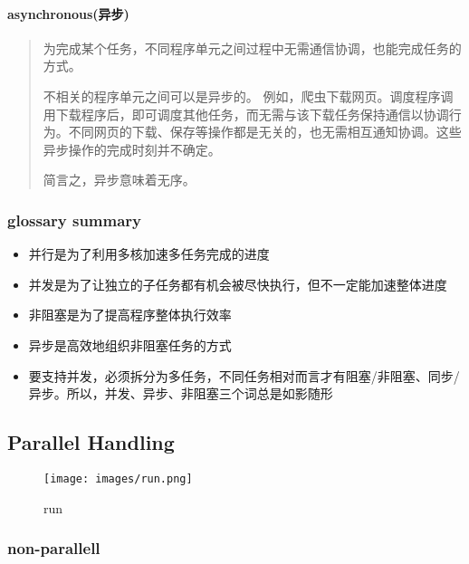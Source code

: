 \documentclass[11pt]{article}
\makeatletter
\def\maxwidth{\ifdim\Gin@nat@width>\linewidth\linewidth
    \else\Gin@nat@width\fi}
\let\Oldincludegraphics\includegraphics
\renewcommand{\includegraphics}[1]{\Oldincludegraphics[width=.8\maxwidth]{#1}}
\providecommand{\tightlist}{%
      \setlength{\itemsep}{0pt}\setlength{\parskip}{0pt}}
\makeatother
\begin{document}
\hypertarget{asynchronousux5f02ux6b65}{%
\paragraph{asynchronous(异步)}\label{asynchronousux5f02ux6b65}}

\begin{quote}
为完成某个任务，不同程序单元之间过程中无需通信协调，也能完成任务的方式。

不相关的程序单元之间可以是异步的。
例如，爬虫下载网页。调度程序调用下载程序后，即可调度其他任务，而无需与该下载任务保持通信以协调行为。不同网页的下载、保存等操作都是无关的，也无需相互通知协调。这些异步操作的完成时刻并不确定。

简言之，异步意味着无序。
\end{quote}

    \hypertarget{glossary-summary}{%
\subsubsection{glossary summary}\label{glossary-summary}}

\begin{itemize}
\tightlist
\item
  并行是为了利用多核加速多任务完成的进度
\item
  并发是为了让独立的子任务都有机会被尽快执行，但不一定能加速整体进度
\item
  非阻塞是为了提高程序整体执行效率
\item
  异步是高效地组织非阻塞任务的方式
\item
  要支持并发，必须拆分为多任务，不同任务相对而言才有阻塞/非阻塞、同步/异步。所以，并发、异步、非阻塞三个词总是如影随形
\end{itemize}

    \hypertarget{parallel-handling}{%
\subsection{Parallel Handling}\label{parallel-handling}}

\begin{figure}
\centering
\texttt{[image: images/run.png]}
\caption{run}
\end{figure}

    \hypertarget{non-parallell}{%
\subsubsection{non-parallell}\label{non-parallell}}
\end{document}

